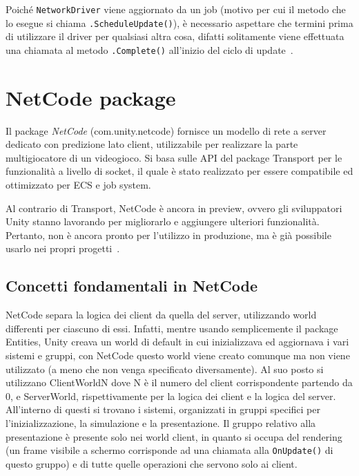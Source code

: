 Poiché \verb|NetworkDriver| viene aggiornato da un job (motivo per cui il metodo che lo esegue si chiama \verb|.ScheduleUpdate()|), è necessario aspettare che termini prima di utilizzare il driver per qualsiasi altra cosa, difatti solitamente viene effettuata una chiamata al metodo \verb|.Complete()| all'inizio del ciclo di update~\cite{doc:unity-transport-manual, youtube:unity-transport}.


\section{NetCode package}
Il package \emph{NetCode} (com.unity.netcode) fornisce un modello di rete a server dedicato con predizione lato client, utilizzabile per realizzare la parte multigiocatore di un videogioco. Si basa sulle API del package Transport per le funzionalità a livello di socket, il quale è stato realizzato per essere compatibile ed ottimizzato per ECS e job system.

Al contrario di Transport, NetCode è ancora in preview, ovvero gli sviluppatori Unity stanno lavorando per migliorarlo e aggiungere ulteriori funzionalità. Pertanto, non è ancora pronto per l'utilizzo in produzione, ma è già possibile usarlo nei propri progetti~\cite{doc:unity-netcode-manual}.

\subsection{Concetti fondamentali in NetCode}

NetCode separa la logica dei client da quella del server, utilizzando world differenti per ciascuno di essi. Infatti, mentre usando semplicemente il package Entities, Unity creava un world di default in cui inizializzava ed aggiornava i vari sistemi e gruppi, con NetCode questo world viene creato comunque ma non viene utilizzato (a meno che non venga specificato diversamente). Al suo posto si utilizzano ClientWorldN dove N è il numero del client corrispondente partendo da 0, e ServerWorld, rispettivamente per la logica dei client e la logica del server.
All'interno di questi si trovano i sistemi, organizzati in gruppi specifici per l'inizializzazione, la simulazione e la presentazione. Il gruppo relativo alla presentazione è presente solo nei world client, in quanto si occupa del rendering (un frame visibile a schermo corrisponde ad una chiamata alla \verb|OnUpdate()| di questo gruppo) e di tutte quelle operazioni che servono solo ai client.

